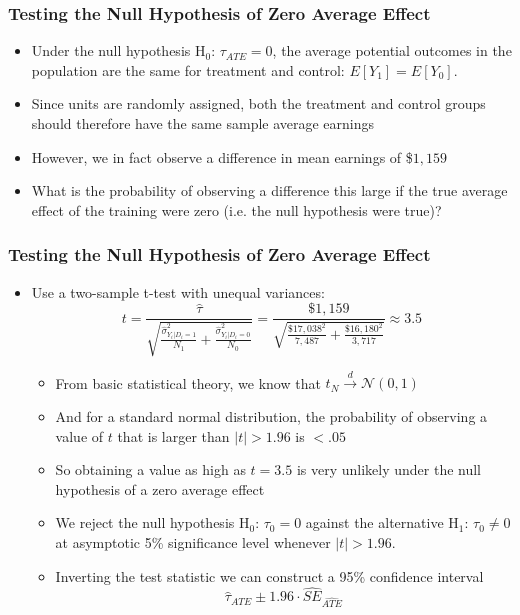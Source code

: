 \documentclass{beamer}
\numberwithin{equation}{section}
\begin{document}
\begin{frame}
  \frametitle{Testing the Null Hypothesis of Zero Average Effect}
\small
\begin{itemize}
  \item Under the null hypothesis H$_0$: $\tau_{ATE}=0$, the average potential outcomes in the population are the same for treatment and control: $E[Y_1]=E[Y_0]$.\medskip
\item Since units are randomly assigned, both the treatment and control groups should therefore have the same sample average earnings\medskip
\item However, we in fact observe a difference in mean earnings of \$$1,159$ \medskip
\item What is the probability of observing a difference this large if the true average effect of the training were zero (i.e. the null hypothesis were true)?
\end{itemize}

\end{frame}

\begin{frame}
  \frametitle{Testing the Null Hypothesis of Zero Average Effect}
\small
\begin{itemize}
  \item Use a two-sample t-test with unequal variances:\[
t=\frac{\widehat{\tau}}{\sqrt{\displaystyle\frac{\widehat{\sigma}_{Y_i|D_i=1}^2}{N_1} + \displaystyle\frac{\widehat{\sigma}_{Y_i|D_i=0}^2}{N_0}}}=\frac{\$1,159}{\sqrt{\displaystyle\frac{\$17,038^2}{7,487} + \displaystyle\frac{\$16,180^2}{3,717}}}\approx3.5
\]
\begin{itemize}
\item From basic statistical theory, we know that $t_N\stackrel{d}{\rightarrow} \mathcal{N}(0,1)$\medskip
\item And for a standard normal distribution, the probability of observing a value of $t$ that is larger than $|t|>1.96$ is $<.05$\medskip
\item So obtaining a value as high as $t=3.5$ is very unlikely under the null hypothesis of a zero average effect\medskip
\item We reject the null hypothesis H$_0$: $\tau_0=0$ against the alternative H$_1$: $\tau_0 \neq 0$ at asymptotic 5\% significance level whenever $|t|>1.96$.\medskip
\item Inverting the test statistic we can construct a 95\% confidence interval
\[
\widehat{\tau}_{ATE}\pm 1.96 \cdot \widehat{ SE}_{\widehat{ATE}}
\]
\end{itemize}
\end{itemize}
\end{frame}
\end{document}
